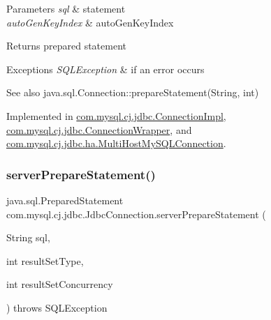 \begin{DoxyParams}{Parameters}
{\em sql} & statement \\
\hline
{\em auto\+Gen\+Key\+Index} & auto\+Gen\+Key\+Index \\
\hline
\end{DoxyParams}
\begin{DoxyReturn}{Returns}
prepared statement 
\end{DoxyReturn}

\begin{DoxyExceptions}{Exceptions}
{\em S\+Q\+L\+Exception} & if an error occurs \\
\hline
\end{DoxyExceptions}
\begin{DoxySeeAlso}{See also}
java.\+sql.\+Connection\+::prepare\+Statement(\+String, int) 
\end{DoxySeeAlso}


Implemented in \mbox{\hyperlink{classcom_1_1mysql_1_1cj_1_1jdbc_1_1_connection_impl_abd651a25d34961e6b9e8b5938f57222f}{com.\+mysql.\+cj.\+jdbc.\+Connection\+Impl}}, \mbox{\hyperlink{classcom_1_1mysql_1_1cj_1_1jdbc_1_1_connection_wrapper_a86037101987ec03d10b75dbba23a8dff}{com.\+mysql.\+cj.\+jdbc.\+Connection\+Wrapper}}, and \mbox{\hyperlink{classcom_1_1mysql_1_1cj_1_1jdbc_1_1ha_1_1_multi_host_my_s_q_l_connection_a26a0ffb4b44f358479e5a39a3241837f}{com.\+mysql.\+cj.\+jdbc.\+ha.\+Multi\+Host\+My\+S\+Q\+L\+Connection}}.

\mbox{\label{interfacecom_1_1mysql_1_1cj_1_1jdbc_1_1_jdbc_connection_aa0692efe53cb2eea133274bedbacd26a}} 
\subsubsection{\texorpdfstring{server\+Prepare\+Statement()}{serverPrepareStatement()}\hspace{0.1cm}{\footnotesize\ttfamily [3/6]}}
{\footnotesize\ttfamily java.\+sql.\+Prepared\+Statement com.\+mysql.\+cj.\+jdbc.\+Jdbc\+Connection.\+server\+Prepare\+Statement (\begin{DoxyParamCaption}\item[{String}]{sql,  }\item[{int}]{result\+Set\+Type,  }\item[{int}]{result\+Set\+Concurrency }\end{DoxyParamCaption}) throws S\+Q\+L\+Exception}

